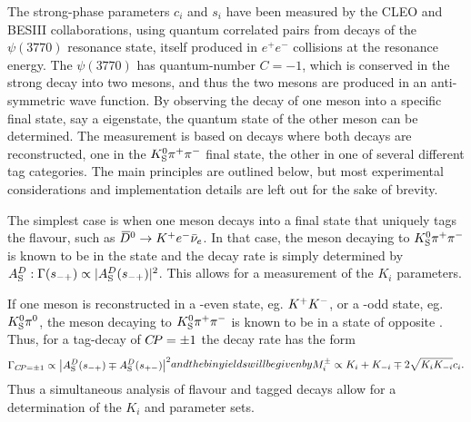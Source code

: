 The strong-phase parameters $c_i$ and $s_i$ have been measured by the CLEO and BESIII collaborations, using quantum correlated \Dz\Dzb pairs from decays of the $\psi(3770)$ resonance state, itself produced in $e^+e^-$ collisions at the resonance energy. The $\psi(3770)$ has quantum-number $C=-1$, which is conserved in the strong decay into two \D mesons, and thus the two \D mesons are produced in an anti-symmetric wave function. By observing the decay of one \D meson into a specific final state, say a \CP eigenstate, the quantum state of the other \D meson can be determined. The measurement is based on decays where both \D decays are reconstructed, one in the ${{K}^0_{\mathrm{S}}}{{\pi}^+}{{\pi}^-}$ final state, the other in one of several different tag categories. The main principles are outlined below, but most experimental considerations and implementation details are left out for the sake of brevity.

The simplest case is when one \D meson decays into a final state that uniquely tags the flavour, such as ${{\kern 0.18em\overline{\kern -0.18em D}}{}^0}\rightarrow{\ensuremath{{K}^+}} e^-\bar\nu_e$. In that case, the \D meson decaying to ${{K}^0_{\mathrm{S}}}{{\pi}^+}{{\pi}^-}$ is known to be in the \Dz state and the decay rate is simply determined by $A_{\rm S}^{D}: \Gamma(s_{-+})\propto |A_{\rm S}^{D}(s_{-+})|^2$. This allows for a measurement of the $K_i$ parameters.

If one \D meson is reconstructed in a \CP-even state, eg. ${{K}^+}{{K}^-}$, or a \CP-odd state, eg. ${{K}^0_{\mathrm{S}}}{{\pi}^0}$, the \D meson decaying to ${{K}^0_{\mathrm{S}}}{{\pi}^+}{{\pi}^-}$ is known to be in a state of opposite \CP. Thus, for a tag-decay of ${C\!P}=\pm1$ the decay rate has the form
\begin{subequations}
\label{eq:CP_cisi}
\begin{align}
    \Gamma_{\CP=\pm1} \propto \left| \ADS(\smp) \mp \ADS(\spm)\right|^2
\end{align}
and the bin yields will be given by
\begin{align}
    M_i^\pm \propto K_i + K_{-i} \mp 2 \sqrt{K_i K_{-i}}c_i.
\end{align}
\end{subequations}
Thus a simultaneous analysis of flavour and \CP tagged decays allow for a determination of the $K_i$ and \ci parameter sets.

